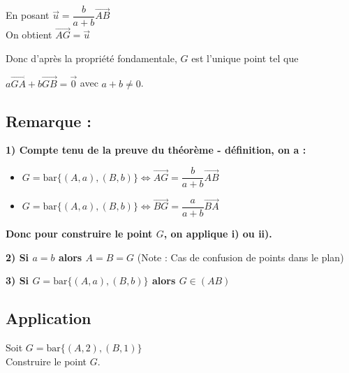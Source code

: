 \documentclass{article}
\begin{document}
\vspace{1.5em}

\noindent En posant $\vec{u} = \dfrac{b}{a + b} \overrightarrow{AB}$ \\
On obtient $\overrightarrow{AG} = \vec{u}$

\vspace{1em}

\noindent Donc d'après la propriété fondamentale, $G$ est l'unique point tel que

 $a \overrightarrow{GA} + b \overrightarrow{GB} = \vec{0}$ avec $a + b \neq 0$.
 
 \subsection*{Remarque :}

\noindent \textbf{1) Compte tenu de la preuve du théorème - définition, on a :}

\vspace{0.5em}

\begin{itemize}
    \item[i)] $G = \text{bar} \{(A, a), (B, b)\} \iff \overrightarrow{AG} = \dfrac{b}{a+b} \overrightarrow{AB}$
    \item[ii)] $G = \text{bar} \{(A, a), (B, b)\} \iff \overrightarrow{BG} = \dfrac{a}{a+b} \overrightarrow{BA}$
\end{itemize}

\vspace{0.5em}

\noindent \textbf{Donc pour construire le point $G$, on applique i) ou ii).}

\vspace{1em}

\noindent \textbf{\color{red}2) Si $a = b$ alors $A = B = G$} (Note : Cas de confusion de points dans le plan)

\vspace{0.5em}

\noindent \textbf{\color{red}3) Si $G = \text{bar} \{(A, a), (B, b)\}$ alors $G \in (AB)$}

\subsection*{Application}

\noindent Soit $G = \text{bar} \{(A, 2), (B, 1)\}$ \\
Construire le point $G$.
\end{document}
